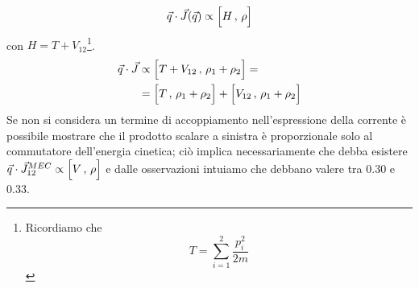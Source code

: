 $$\vec{q}\cdot\vec{J}(\vec{q}) \propto \Bigl [ H\,,\,\rho \Bigr ]$$
con $H = T+V_{12}$\footnote{Ricordiamo che %
$$T=\sum_{i=1}^2 \frac{p_i^2}{2m}$$%
}.
\begin{displaymath}
\begin{aligned}
\vec{q}\cdot\vec{J}&\propto \Bigl [ T+V_{12}\,,\,\rho_1+\rho_2 \Bigr ] = \\
&= \Bigl [ T\,,\,\rho_1+\rho_2 \Bigr ] + \Bigl [ V_{12}\,,\,\rho_1+\rho_2 \Bigr ]
\end{aligned}
\end{displaymath}
Se non si considera un termine di accoppiamento nell'espressione della corrente è possibile mostrare che il prodotto scalare a sinistra è proporzionale solo al commutatore dell'energia cinetica; ciò implica necessariamente che debba esistere $\vec{q}\cdot\vec{J}_{12}^{MEC}\propto\Bigl [ V\,,\,\rho \Bigr ]$ e dalle osservazioni intuiamo che debbano valere tra 0.30 e 0.33.
\newpage
